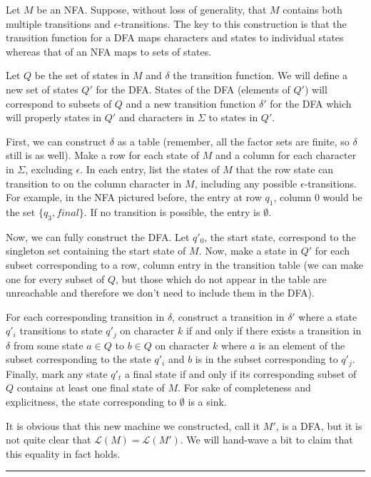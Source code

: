 \documentclass[twoside]{article}
\newenvironment{proof}{{\bf Proof:}}{\hfill\rule{2mm}{2mm}}
\begin{document}

\begin{proof}	Let $M$ be an NFA.  Suppose, without loss of generality, that $M$ contains both multiple transitions and $\epsilon$-transitions.  The key to this construction is that the transition function for a DFA maps characters and states to individual states whereas that of an NFA maps to sets of states.

Let $Q$ be the set of states in $M$ and $\delta$ the transition function.  We will define a new set of states $Q'$ for the DFA.  States of the DFA (elements of $Q'$) will correspond to subsets of $Q$ and a new transition function $\delta'$ for the DFA which will properly states in $Q'$ and characters in $\Sigma$ to states in $Q'$.  

First, we can construct $\delta$ as a table (remember, all the factor sets are finite, so $\delta$ still is as well).  Make a row for each state of $M$ and a column for each character in $\Sigma$, excluding $\epsilon$.  In each entry, list the states of $M$ that the row state can transition to on the column character in $M$, including any possible $\epsilon$-transitions.  For example, in the NFA pictured before, the entry at row $q_1$, column $0$ would be the set $\{q_3,final\}$.  If no transition is possible, the entry is $\emptyset$.
	
Now, we can fully construct the DFA. Let $q'_0$, the start state, correspond to the singleton set containing the start state of $M$.  Now, make a state in $Q'$ for each subset corresponding to a row, column entry in the transition table (we can make one for every subset of $Q$, but those which do not appear in the table are unreachable and therefore we don't need to include them in the DFA).

For each corresponding transition in $\delta$, construct a transition in $\delta'$ where a state $q'_i$ transitions to state $q'_j$ on character $k$ if and only if there exists a transition in $\delta$ from some state $a\in Q$ to $b\in Q$ on character $k$ where $a$ is an element of the subset corresponding to the state $q'_i$ and $b$ is in the subset corresponding to $q'_j$.  Finally, mark any state $q'_t$ a final state if and only if its corresponding subset of $Q$ contains at least one final state of $M$.  For sake of completeness and explicitness, the state corresponding to $\emptyset$ is a sink.

It is obvious that this new machine we constructed, call it $M'$, is a DFA, but it is not quite clear that $\mathcal{L}(M) = \mathcal{L}(M')$.  We will hand-wave a bit to claim that this equality in fact holds.


\end{proof}
\end{document}
